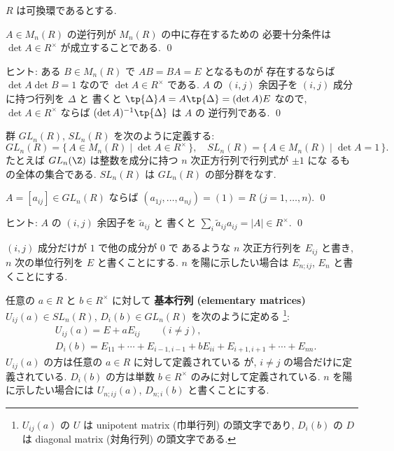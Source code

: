 \documentclass[12pt,twoside]{jarticle}
\begin{document}
$R$ は可換環であるとする.


\begin{question}
  $A\in M_n(R)$ の逆行列が $M_n(R)$ の中に存在するための
  必要十分条件は $\det A\in R^\times$ が成立することである.
  \qed
\end{question}

\noindent
ヒント: ある $B\in M_n(R)$ で $AB=BA=E$ となるものが
存在するならば $\det A \det B=1$ なので $\det A\in R^\times$ である.
$A$ の $(i,j)$ 余因子を $(i,j)$ 成分に持つ行列を $\Delta$ と
書くと $\tp{\Delta}A=A\tp{\Delta}=(\det A)E$ 
なので, $\det A\in R^{\times}$ ならば $(\det A)^{-1}\tp{\Delta}$ は $A$ の
逆行列である. 
\qed

\medskip

群 $GL_n(R)$, $SL_n(R)$ を次のように定義する:
\begin{equation*}
  GL_n(R) = \{\, A\in M_n(R) \mid \det A \in R^{\times} \,\},
  \quad
  SL_n(R) = \{\, A\in M_n(R) \mid \det A = 1 \,\}.
\end{equation*}
たとえば $GL_n(\Z)$ は整数を成分に持つ $n$ 次正方行列で行列式が $\pm 1$ にな
るもの全体の集合である.  $SL_n(R)$ は $GL_n(R)$ の部分群をなす.


\begin{question}
\label{q:(ai1,...,ain)=(1)}
  $A=[a_{ij}]\in GL_n(R)$ ならば $(a_{1j},\dots,a_{nj})=(1)=R$
  \enspace($j=1,\dots,n$).
  \qed
\end{question}

\noindent
ヒント: $A$ の $(i,j)$ 余因子を $\tilde{a}_{ij}$ と
書くと $\sum_{i} \tilde{a}_{ij}a_{ij}=|A|\in R^\times$.
\qed

\medskip

$(i,j)$ 成分だけが $1$ で他の成分が $0$ で
あるような $n$ 次正方行列を $E_{ij}$ と書き,
$n$ 次の単位行列を $E$ と書くことにする.
$n$ を陽に示したい場合は $E_{n;ij}$, $E_n$ と書くことにする.

任意の $a\in R$ と $b\in R^{\times}$ に対して
{\bf 基本行列 (elementary matrices)} 
$U_{ij}(a)\in SL_n(R)$, $D_i(b)\in GL_n(R)$ を次のように定める%
\footnote{$U_{ij}(a)$ の $U$ は unipotent matrix (巾単行列) の頭文字であり,
  $D_i(b)$ の $D$ は diagonal matrix (対角行列) の頭文字である.}:
\begin{align*}
  &
  U_{ij}(a) 
  = E + a E_{ij}  \qquad (i\ne j),
  \\ &
  D_i(b) 
  = E_{11} + \cdots + E_{i-1,i-1}
  + bE_{ii}
  + E_{i+1,i+1} + \cdots + E_{nn}.
\end{align*}
$U_{ij}(a)$ の方は任意の $a\in R$ に対して定義されている
が, $i\ne j$ の場合だけに定義されている.
$D_i(b)$ の方は単数 $b\in R^\times$ のみに対して定義されている.
$n$ を陽に示したい場合には $U_{n;ij}(a)$, $D_{n;i}(b)$ と書くことにする.
\end{document}
